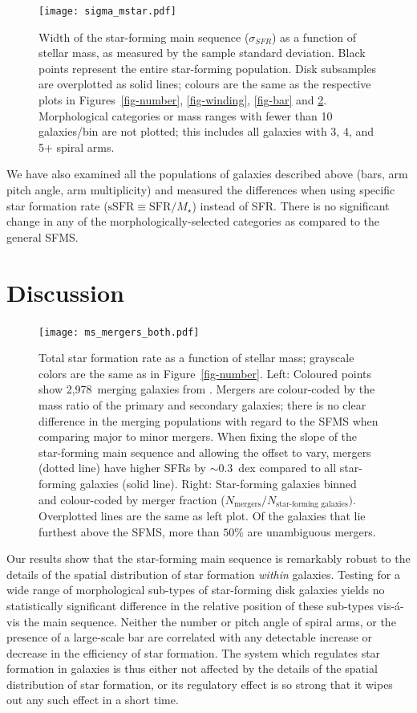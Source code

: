 \documentclass[useAMS,usenatbib]{mn2e}
\begin{document}
\begin{figure}
\texttt{[image: sigma\_mstar.pdf]}
\caption{Width of the star-forming main sequence ($\sigma_{SFR}$) as a function of stellar mass, as measured by the sample standard deviation. Black points represent the entire star-forming population. Disk subsamples are overplotted as solid lines; colours are the same as the respective plots in Figures~\ref{fig-number}, \ref{fig-winding}, \ref{fig-bar} and \ref{fig-mergers}. Morphological categories or mass ranges with fewer than 10 galaxies/bin are not plotted; this includes all galaxies with 3, 4, and 5+ spiral arms.
\label{fig-sigma}}
\end{figure}

We have also examined all the populations of galaxies described above (bars, arm pitch angle, arm multiplicity) and measured the differences when using specific star formation rate ($\textrm{sSFR}\equiv\textrm{SFR}/M_\star$) instead of SFR. There is no significant change in any of the morphologically-selected categories as compared to the general SFMS. 


\section{Discussion}\label{sec-discussion}

\begin{figure}
\texttt{[image: ms\_mergers\_both.pdf]}
\caption{Total star formation rate as a function of stellar mass; grayscale colors are the same as in Figure~\ref{fig-number}. Left: Coloured points show 2,978~merging galaxies from \citet{dar10a}. Mergers are colour-coded by the mass ratio of the primary and secondary galaxies; there is no clear difference in the merging populations with regard to the SFMS when comparing major to minor mergers. When fixing the slope of the star-forming main sequence and allowing the offset to vary, mergers (dotted line) have higher SFRs by $\sim0.3$~dex compared to all star-forming galaxies (solid line). Right: Star-forming galaxies binned and colour-coded by merger fraction ($N_\textrm{mergers}/N_\textrm{star-forming galaxies})$. Overplotted lines are the same as left plot. Of the galaxies that lie furthest above the SFMS, more than $50\%$ are unambiguous mergers. 
\label{fig-mergers}}
\end{figure}

Our results show that the star-forming main sequence is remarkably robust to the details of the spatial distribution of star formation \textit{within} galaxies. Testing for a wide range of morphological sub-types of star-forming disk galaxies yields no statistically significant difference in the relative position of these sub-types vis-\'a-vis the main sequence. Neither the number or pitch angle of spiral arms, or the presence of a large-scale bar are correlated with any detectable increase or decrease in the efficiency of star formation. The system which regulates star formation in galaxies is thus either not affected by the details of the spatial distribution of star formation, or its regulatory effect is so strong that it wipes out any such effect in a short time. 
\end{document}
